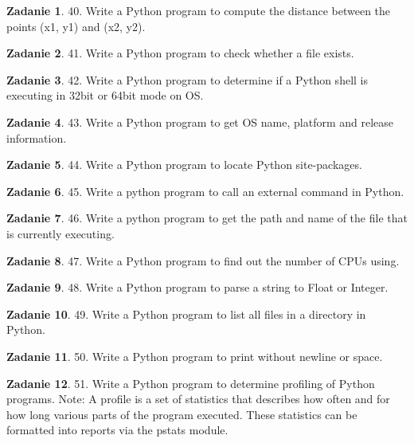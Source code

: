 \documentclass[11pt]{article}
\theoremstyle{definition}
\newtheorem{zadanie}{Zadanie}
\begin{document}
\begin{zadanie}
40. Write a Python program to compute the distance between the points (x1, y1) and (x2, y2).
\end{zadanie}

\begin{zadanie}
41. Write a Python program to check whether a file exists.
\end{zadanie}

\begin{zadanie}
42. Write a Python program to determine if a Python shell is executing in 32bit or 64bit mode on OS.
\end{zadanie}

\begin{zadanie}
43. Write a Python program to get OS name, platform and release information.
\end{zadanie}

\begin{zadanie}
44. Write a Python program to locate Python site-packages.
\end{zadanie}

\begin{zadanie}
45. Write a python program to call an external command in Python.
\end{zadanie}

\begin{zadanie}
46. Write a python program to get the path and name of the file that is currently executing.
\end{zadanie}

\begin{zadanie}
47. Write a Python program to find out the number of CPUs using.
\end{zadanie}

\begin{zadanie}
48. Write a Python program to parse a string to Float or Integer.
\end{zadanie}

\begin{zadanie}
49. Write a Python program to list all files in a directory in Python.
\end{zadanie}

\begin{zadanie}
50. Write a Python program to print without newline or space.
\end{zadanie}

\begin{zadanie}
51. Write a Python program to determine profiling of Python programs.
Note: A profile is a set of statistics that describes how often and for how long various parts of the program executed. These statistics can be formatted into reports via the pstats module.
\end{zadanie}
\end{document}
